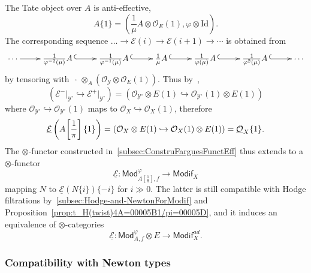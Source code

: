 \documentclass[11pt]{article}
\theoremstyle{definition}
\numberwithin{equation}{section}
\numberwithin{figure}{section}
\numberwithin{table}{section}
\newcommand{\Mod}{\mathsf{Mod}}
\newcommand{\Modif}{\mathsf{Modif}}
\newcommand*{\Mk}{\mkern -2mu}
\begin{document}
The Tate object over $A$ is anti-effective,
\[
A\{1\}=\left({\frac{1}{\mu}}A\otimes\mathcal{O}_{E}(1),\varphi\otimes\mathrm{Id}\right).
\]
The corresponding sequence $\dots\rightarrow\mathscr{E}(i)\rightarrow\mathscr{E}(i+1)\rightarrow\cdots$ is obtained from
\[
\xymatrix@C=2pc{\cdots\ar[r] & \frac{1}{\varphi^{-2}(\mu)}A\,\ar@{^{(}->}[r] & \frac{1}{\varphi^{-1}(\mu)}A\,\ar@{^{(}->}[r] & \frac{1}{\mu}A\,\ar@{^{(}->}[r] & \frac{1}{\varphi(\mu)}A\,\ar@{^{(}->}[r] & \frac{1}{\varphi^{2}(\mu)}A\,\ar@{^{(}->}[r] & \cdots}
\]
by tensoring with ${\,\cdot\,}\otimes_{A}(\mathscr{O}_{\mathscr{Y}}\otimes\mathcal{O}_{E}(1))$. Thus by~\cite[3.23]{BaMoSc16},
\[
\left(\mathscr{E}^{-}\vert_{\mathscr{Y}^{\circ}}\hookrightarrow\mathscr{E}^{+}\vert_{\mathscr{Y}^{\circ}}\right)=\left(\mathscr{O}_{\mathscr{Y}^{\circ}}\otimes E(1)\hookrightarrow\mathscr{O}_{\mathscr{Y}^{\circ}}(1)\otimes E(1)\right)
\]
where $\mathscr{O}_{\mathscr{Y}^{\circ}}\hookrightarrow\mathscr{O}_{\mathscr{Y}^{\circ}}(1)$ maps to $\mathcal{O}_{X}\hookrightarrow\mathcal{O}_{X}(1)$, therefore
\[
\underline{\mathcal{E}}\left(A\Mk\left[{\frac{1}{\pi}}\right]\{1\}\right)=\left(\mathcal{O}_{X}\otimes E(1)\hookrightarrow\mathcal{O}_{X}(1)\otimes E(1)\right)=\underline{\mathcal{O}}_{X}\{1\}.
\]
The $\otimes$-functor constructed in~\ref{subsec:ConstruFarguesFunctEff} thus extends to a $\otimes$-functor
\[
\underline{\mathcal{E}}:\Mod_{A[\frac{1}{\pi}],f}^{\varphi}\rightarrow\Modif_{X}
\]
mapping $N$ to $\underline{\mathcal{E}}(N\{i\})\{-i\}$ for $i\gg0$. The latter is still compatible with Hodge filtrations by~\ref{subsec:Hodge-and-NewtonForModif} and Proposition~\ref{prop:t_H(twist)4A=00005B1/pi=00005D}, and it induces an equivalence of $\otimes$-categories
\[
\underline{\mathcal{E}}:\Mod_{A,f}^{\varphi}\otimes E\rightarrow\Modif_{X}^{ad}.
\]

\subsubsection{Compatibility with Newton types}\label{subsec:CompNewton}
\end{document}
